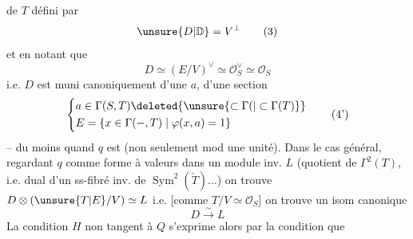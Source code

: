 de $T$ défini par
\[
\unsure{D|\mathbb D}=V^\perp\tag*{(3)}
\]
et en notant que
\[
D\simeq(E/V)^\vee\simeq\mathcal O_S^\vee\simeq\mathcal O_S\tag*{(4)}
\]
i.e. $D$ est muni canoniquement d'une  $a$,  d'une section
\[
\left\{\begin{aligned}
&a\in\Gamma(S,T)\deleted{\unsure{\subset\Gamma(|\subset\Gamma(T)}}\\
&E=\{x\in\Gamma(-,T)\mid\varphi(x,a)=1\}
\end{aligned}\right.\tag*{(4')}
\]
-- du moins quand $q$ est \uline{}  (non seulement mod une unité). Dans le cas général, regardant $q$ comme forme à valeurs dans un module inv. $L$ (quotient de $\Gamma^2(T)$, i.e. dual d'un ss-fibré inv. de $\operatorname{Sym}^2(\check T)\ldots$) on trouve $D\otimes(\unsure{T|E}/V)\simeq L$ i.e. [comme $T/V\simeq\mathcal O_S$] on trouve un isom canonique
\[
D\xrightarrow{\sim}L\tag*{(5)}
\]
La condition $H$ non tangent à $Q$ s'exprime alors par la condition que
